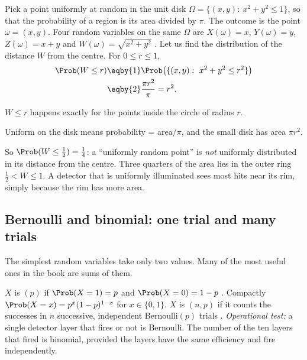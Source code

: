 \label{1b:ex:disk}
Pick a point uniformly at random in the unit disk
$\Omega=\{(x,y):\ x^2+y^2\le1\}$, so that the probability of a region is its
area divided by $\pi$. The outcome is the point $\omega=(x,y)$. Four random
variables on the same $\Omega$ are $X(\omega)=x$, $Y(\omega)=y$,
$Z(\omega)=x+y$ and $W(\omega)=\sqrt{x^2+y^2}$ . Let us find the
distribution of the distance $W$ from the centre. For $0\le r\le1$,
\begin{align*}
  \Prob(W\le r)
  &\eqby{1} \Prob\bigl(\{(x,y):\ x^2+y^2\le r^2\}\bigr)\\
  &\eqby{2} \frac{\pi r^2}{\pi}
   = r^2 .
\end{align*}
\begin{explain}
  \item $W\le r$ happens exactly for the points inside the circle of radius $r$.
  \item Uniform on the disk means probability = area$/\pi$, and the small disk
        has area $\pi r^2$.
\end{explain}
So $\Prob(W\le\tfrac12)=\tfrac14$: a ``uniformly random point'' is \emph{not}
uniformly distributed in its distance from the centre. Three quarters of the
area lies in the outer ring $\tfrac12<W\le1$. A detector that is uniformly
illuminated sees most hits near its rim, simply because the rim has more area.

\subsection{Bernoulli and binomial: one trial and many trials}

The simplest random variables take only two values. Many of the most useful
ones in the book are sums of them.

\begin{workdef}
$X$ is $(p)$ if $\Prob(X=1)=p$ and $\Prob(X=0)=1-p$
. Compactly
$\Prob(X=x)=p^x(1-p)^{1-x}$ for $x\in\{0,1\}$.
$X$ is $(n,p)$ if it counts the successes in $n$
successive, independent Bernoulli$(p)$ trials .
\emph{Operational test:} a single detector layer that fires or not is
Bernoulli. The number of the ten layers that fired is binomial, provided the
layers have the same efficiency and fire independently.
\end{workdef}

